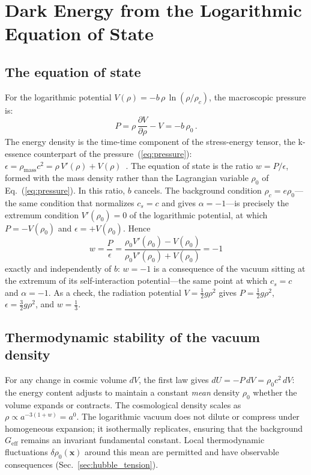 \documentclass[12pt, a4paper]{article}
\newcommand{\Geff}{G_{\mathrm{eff}}}
\begin{document}
\newpage
\section{Dark Energy from the Logarithmic Equation of State}
\label{sec:dark_energy}

\subsection{The equation of state}

For the logarithmic potential $V(\rho) = -b\,\rho\,\ln(\rho/\rho_c)$, the macroscopic pressure is:
\begin{equation}
    P = \rho\,\frac{\partial V}{\partial\rho} - V = -b\,\rho_0\,.
\label{eq:pressure}
\end{equation}
The energy density is the time-time component of the stress-energy tensor, the k-essence counterpart of the pressure~(\ref{eq:pressure}): $\epsilon = \rho_{\mathrm{mass}}c^2 = \rho\,V'(\rho) + V(\rho)$~\cite{kulangiev_2026b}. The equation of state is the ratio $w = P/\epsilon$, formed with the mass density rather than the Lagrangian variable $\rho_0$ of Eq.~(\ref{eq:pressure}). In this ratio, $b$ cancels. The background condition $\rho_c = e\rho_0$---the same condition that normalizes $c_s = c$ and gives $\alpha = -1$---is precisely the extremum condition $V'(\rho_0) = 0$ of the logarithmic potential, at which $P = -V(\rho_0)$ and $\epsilon = +V(\rho_0)$. Hence
\begin{equation}
    \boxed{\;w = \frac{P}{\epsilon} = \frac{\rho_0 V'(\rho_0) - V(\rho_0)}{\rho_0 V'(\rho_0) + V(\rho_0)} = -1\;}
\label{eq:w_exact}
\end{equation}
exactly and independently of $b$: $w = -1$ is a consequence of the vacuum sitting at the extremum of its self-interaction potential---the same point at which $c_s = c$ and $\alpha = -1$. As a check, the radiation potential $V = \tfrac12 g\rho^2$ gives $P = \tfrac12 g\rho^2$, $\epsilon = \tfrac32 g\rho^2$, and $w = \tfrac13$.

\subsection{Thermodynamic stability of the vacuum density}

For any change in cosmic volume $dV$, the first law gives $dU = -P\,dV = \rho_0 c^2\,dV$: the energy content adjusts to maintain a constant \emph{mean} density $\rho_0$ whether the volume expands or contracts. The cosmological density scales as $\rho \propto a^{-3(1+w)} = a^0$. The logarithmic vacuum does not dilute or compress under homogeneous expansion; it isothermally replicates, ensuring that the background $\Geff$ remains an invariant fundamental constant. Local thermodynamic fluctuations $\delta\rho_0(\mathbf{x})$ around this mean are permitted and have observable consequences (Sec.~\ref{sec:hubble_tension}).
\end{document}
